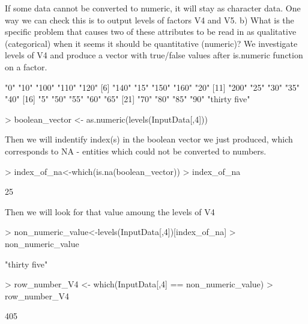 \documentclass[12pt]{article}
\begin{document}
If some data cannot be converted to numeric, it will stay as character data.
One way we can check this is to output levels of factors V4 and V5.
\newpage
b) What is the specific problem that causes two of these attributes to be read in as
qualitative (categorical) when it seems it should be quantitative (numeric)?
We investigate levels of V4 and produce a vector with true/false values
after is.numeric function on a factor.
\begin{Schunk}
\begin{Soutput}
 [1] "0"           "10"          "100"         "110"         "120"        
 [6] "140"         "15"          "150"         "160"         "20"         
[11] "200"         "25"          "30"          "35"          "40"         
[16] "5"           "50"          "55"          "60"          "65"         
[21] "70"          "80"          "85"          "90"          "thirty five"
\end{Soutput}
\begin{Sinput}
> boolean_vector <- as.numeric(levels(InputData[,4]))
\end{Sinput}
\end{Schunk}
Then we will indentify index(s) in the boolean vector we just produced, which corresponds
to NA - entities which could not be converted to numbers.
\begin{Schunk}
\begin{Sinput}
> index_of_na<-which(is.na(boolean_vector))
> index_of_na
\end{Sinput}
\begin{Soutput}
[1] 25
\end{Soutput}
\end{Schunk}
Then we will look for that value amoung the levels of V4
\begin{Schunk}
\begin{Sinput}
> non_numeric_value<-levels(InputData[,4])[index_of_na]
> non_numeric_value
\end{Sinput}
\begin{Soutput}
[1] "thirty five"
\end{Soutput}
\begin{Sinput}
> row_number_V4 <- which(InputData[,4] == non_numeric_value)
> row_number_V4
\end{Sinput}
\begin{Soutput}
[1] 405
\end{Soutput}
\end{Schunk}
\end{document}
